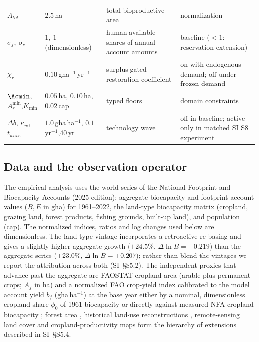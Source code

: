 \begin{table}[!htbp]
\begin{tabularx}{\textwidth}{@{}>{\raggedright\arraybackslash}p{} >{\raggedright\arraybackslash}p{} >{\raggedright\arraybackslash}X >{\raggedright\arraybackslash}p{}@{}}
$A_{tot}$ & $2.5$\,ha & total bioproductive area & normalization \\
$\sigma_f,\ \sigma_c$ & $1,\ 1$ (dimensionless) & human-available shares of annual account amounts & baseline ($<1$: reservation extension) \\
$\chi_r$ & $0.10$\,gha$^{-1}$\,yr$^{-1}$ & surplus-gated restoration coefficient & on with endogenous demand; off under frozen demand \\
$\Acmin$, $A_r^{\min}$,\newline $K_{\min}$ & $0.05$\,ha, $0.10$\,ha,\newline $0.02$\,cap & typed floors & domain constraints \\
$\Delta b$, $\kappa_w$,\newline $t_{wave}$ & $1.0$\,gha\,ha$^{-1}$, $0.1$\,yr$^{-1}$,\newline $40$\,yr & technology wave & off in baseline; active only in matched SI S8 experiment \\
\bottomrule
\end{tabularx}
\end{table}

\subsection{Data and the observation operator}\label{sec:data}

The empirical analysis uses the world series of the National Footprint and Biocapacity Accounts (2025 edition): aggregate biocapacity and footprint account values ($B,E$ in gha) for 1961--2022, the land-type biocapacity matrix (cropland, grazing land, forest products, fishing grounds, built-up land), and population (cap). The normalized indices, ratios and log changes used below are dimensionless. The land-type vintage incorporates a retroactive re-basing and gives a slightly higher aggregate growth ($+24.5\%$, $\Delta\ln B=+0.219$) than the aggregate series ($+23.0\%$, $\Delta\ln B=+0.207$); rather than blend the vintages we report the attribution across both (SI~\S S5.2). The independent proxies that advance past the aggregate are FAOSTAT cropland area (arable plus permanent crops; $A_f$ in ha) and a normalized FAO crop-yield index calibrated to the model account yield $b_f$ (gha\,ha$^{-1}$) at the base year either by a nominal, dimensionless cropland share $\phi_0$ of 1961 biocapacity or directly against measured NFA cropland biocapacity \citep{FAO2023}; forest area \citep{FAO2020}, historical land-use reconstructions \citep{Hurtt2011,KleinGoldewijk2017}, remote-sensing land cover \citep{ESA2017,Copernicus2019} and cropland-productivity maps \citep{Monfreda2008} form the hierarchy of extensions described in SI~\S S5.4.

